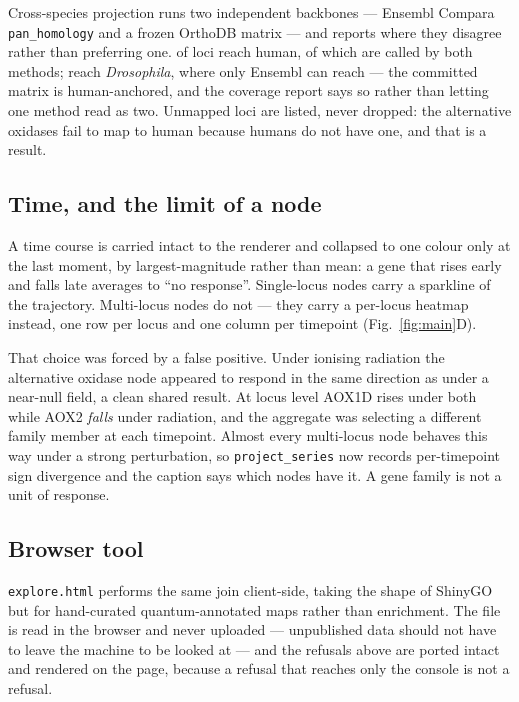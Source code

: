 \documentclass[11pt,a4paper]{article}
\begin{document}
Cross-species projection runs two independent backbones --- Ensembl Compara
\texttt{pan\_homology} \citep{Cunningham2022} and a frozen OrthoDB matrix
\citep{Kuznetsov2022} --- and reports where they disagree rather than preferring one.
\OrthHuman{} of \NLoci{} loci reach human, of which \OrthHumanCorroborated{} are
called by both methods; \OrthFly{} reach \emph{Drosophila}, where only Ensembl can
reach --- the committed matrix is human-anchored, and the coverage report says so rather
than letting one method read as two. Unmapped
loci are listed, never dropped: the alternative oxidases fail to map to human because
humans do not have one, and that is a result.

\subsection{Time, and the limit of a node}

A time course is carried intact to the renderer and collapsed to one colour only at the
last moment, by largest-magnitude rather than mean: a gene that rises early and falls
late averages to ``no response''. Single-locus nodes carry a sparkline of the
trajectory. Multi-locus nodes do not --- they carry a per-locus heatmap instead, one row
per locus and one column per timepoint (Fig.~\ref{fig:main}D).

That choice was forced by a false positive. Under ionising radiation the alternative
oxidase node appeared to respond in the same direction as under a near-null field, a
clean shared result. At locus level AOX1D rises under both while AOX2 \emph{falls} under
radiation, and the aggregate was selecting a different family member at each timepoint.
Almost every multi-locus node behaves this way under a strong perturbation, so
\texttt{project\_series} now records per-timepoint sign divergence and the caption says
which nodes have it. A gene family is not a unit of response.

\subsection{Browser tool}\label{sec:browser}

\texttt{explore.html} performs the same join client-side, taking the shape of ShinyGO
\citep{Ge2020} but for hand-curated quantum-annotated maps rather than enrichment. The
file is read in the browser and never uploaded --- unpublished data should not have to
leave the machine to be looked at --- and the refusals above are ported intact and
rendered on the page, because a refusal that reaches only the console is not a refusal.
\end{document}
